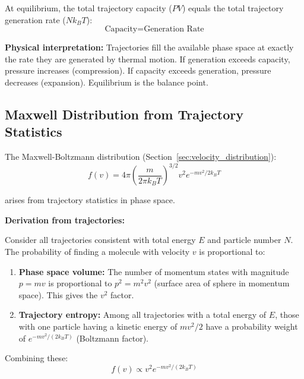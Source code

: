 \begin{proposition}
\label{prop:trajectory_balance}
At equilibrium, the total trajectory capacity ($PV$) equals the total trajectory generation rate ($Nk_BT$):
\begin{equation}
\text{Capacity} = \text{Generation Rate}
\end{equation}
\end{proposition}

\textbf{Physical interpretation:} Trajectories fill the available phase space at exactly the rate they are generated by thermal motion. If generation exceeds capacity, pressure increases (compression). If capacity exceeds generation, pressure decreases (expansion). Equilibrium is the balance point.



\subsection{Maxwell Distribution from Trajectory Statistics}

The Maxwell-Boltzmann distribution (Section~\ref{sec:velocity_distribution}):
\begin{equation}
f(v) = 4\pi \left(\frac{m}{2\pi k_BT}\right)^{3/2} v^2 e^{-mv^2/2k_BT}
\end{equation}

arises from trajectory statistics in phase space.

\textbf{Derivation from trajectories:}

Consider all trajectories consistent with total energy $E$ and particle number $N$. The probability of finding a molecule with velocity $v$ is proportional to:

\begin{enumerate}
\item \textbf{Phase space volume:} The number of momentum states with magnitude $p = mv$ is proportional to $p^2 = m^2v^2$ (surface area of sphere in momentum space). This gives the $v^2$ factor.

\item \textbf{Trajectory entropy:} Among all trajectories with a total energy of $E$, those with one particle having a kinetic energy of $mv^2/2$ have a probability weight of $e^{-mv^2/(2k_BT)}$ (Boltzmann factor).
\end{enumerate}

Combining these:
\begin{equation}
f(v) \propto v^2 e^{-mv^2/(2k_BT)}
\end{equation}

